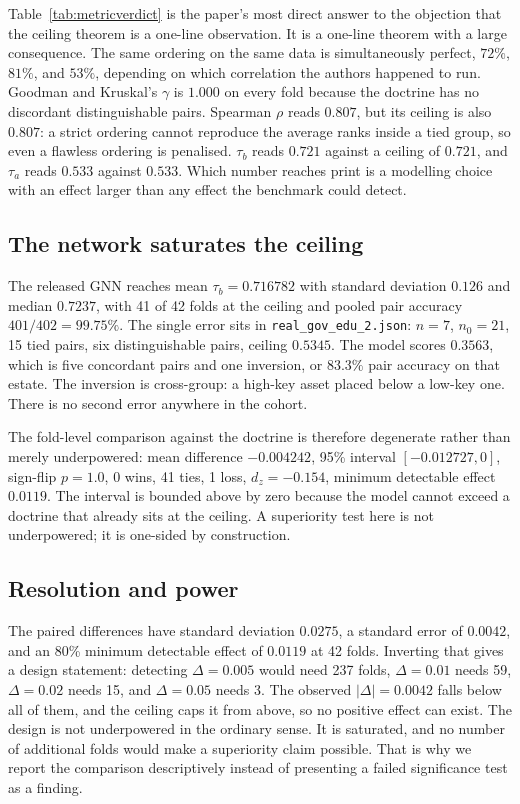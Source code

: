 \documentclass[journal,10pt]{IEEEtran}
\newcommand{\tb}{\tau_b}
\newcommand{\nzero}{n_0}
\begin{document}
Table~\ref{tab:metricverdict} is the paper's most direct answer to the objection that the ceiling
theorem is a one-line observation. It is a one-line theorem with a large consequence. The same
ordering on the same data is simultaneously perfect, $72\%$, $81\%$, and $53\%$, depending on which
correlation the authors happened to run. Goodman and Kruskal's $\gamma$ is $1.000$ on every fold
because the doctrine has no discordant distinguishable pairs. Spearman $\rho$ reads $0.807$, but
its ceiling is also $0.807$: a strict ordering cannot reproduce the average ranks inside a tied
group, so even a flawless ordering is penalised. $\tb$ reads $0.721$ against a ceiling of $0.721$,
and $\tau_a$ reads $0.533$ against $0.533$. Which number reaches print is a modelling choice with
an effect larger than any effect the benchmark could detect.

\subsection{The network saturates the ceiling}

The released GNN reaches mean $\tb=0.716782$ with standard deviation $0.126$ and median $0.7237$,
with 41 of 42 folds at the ceiling and pooled pair accuracy $401/402=99.75\%$. The single error sits
in \texttt{real\_gov\_edu\_2.json}: $n=7$, $\nzero=21$, 15 tied pairs, six distinguishable pairs,
ceiling $0.5345$. The model scores $0.3563$, which is five concordant pairs and one inversion, or
$83.3\%$ pair accuracy on that estate. The inversion is cross-group: a high-key asset placed below
a low-key one. There is no second error anywhere in the cohort.

The fold-level comparison against the doctrine is therefore degenerate rather than merely
underpowered: mean difference $-0.004242$, 95\% interval $[-0.012727,0]$, sign-flip $p=1.0$, 0 wins,
41 ties, 1 loss, $d_z=-0.154$, minimum detectable effect $0.0119$. The interval is bounded above by
zero because the model cannot exceed a doctrine that already sits at the ceiling. A superiority test
here is not underpowered; it is one-sided by construction.

\subsection{Resolution and power}
\label{sec:power}

The paired differences have standard deviation $0.0275$, a standard error of $0.0042$, and an 80\%
minimum detectable effect of $0.0119$ at 42 folds. Inverting that gives a design statement:
detecting $\Delta=0.005$ would need 237 folds, $\Delta=0.01$ needs 59, $\Delta=0.02$ needs 15, and
$\Delta=0.05$ needs 3. The observed $|\Delta|=0.0042$ falls below all of them, and the ceiling caps
it from above, so no positive effect can exist. The design is not underpowered in the ordinary
sense. It is saturated, and no number of additional folds would make a superiority claim possible.
That is why we report the comparison descriptively instead of presenting a failed significance test
as a finding.
\end{document}

